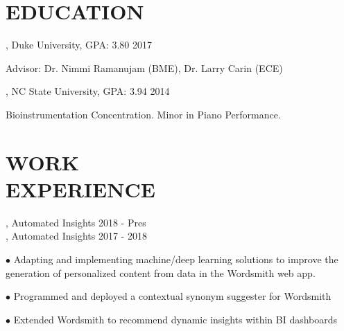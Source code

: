 \documentclass[resmargin, 11pt]{resume_style_class} %
\newenvironment{outline}
  {\begin{list}{}{\setlength{\leftmargin}{30pt}\setlength\itemsep{-2pt}}}
  {\end{list}}
\begin{document}
\begin{resume}


\section{EDUCATION}

, Duke University, GPA: 3.80 \hfill 2017
\begin{outline}
\item Advisor: Dr. Nimmi Ramanujam (BME), Dr. Larry Carin (ECE)
\end{outline}

, NC State University, GPA: 3.94 \hfill 2014
\begin{outline}
\item Bioinstrumentation Concentration. Minor in Piano Performance.
\end{outline}
 
 
 
\section{WORK \\ EXPERIENCE}
, Automated Insights \hfill 2018 - Pres \\
, Automated Insights \hfill 2017 - 2018
\begin{outline}
\item[$\bullet$\hspace{0.1cm}]  Adapting and implementing machine/deep learning solutions to improve the generation of personalized content from data in the Wordsmith web app.
\item[$\bullet$\hspace{0.1cm}] Programmed and deployed a contextual synonym suggester for Wordsmith
\item[$\bullet$\hspace{0.1cm}] Extended Wordsmith to recommend dynamic insights within BI dashboards
\end{outline} 
 

\end{resume}
\end{document}
